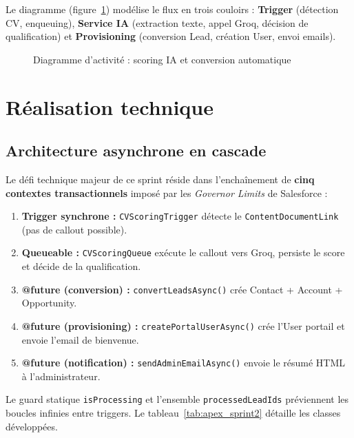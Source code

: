 Le diagramme (figure~\ref{fig:act_scoring}) modélise le flux en trois couloirs : \textbf{Trigger} (détection CV, enqueuing), \textbf{Service IA} (extraction texte, appel Groq, décision de qualification) et \textbf{Provisioning} (conversion Lead, création User, envoi emails).

\begin{figure}[hbt!]
  \centering
  \caption{Diagramme d'activité : scoring IA et conversion automatique}
  \label{fig:act_scoring}
\end{figure}
\FloatBarrier

\section{Réalisation technique}

\subsection{Architecture asynchrone en cascade}

Le défi technique majeur de ce sprint réside dans l'enchaînement de \textbf{cinq contextes transactionnels} imposé par les \textit{Governor Limits} de Salesforce :

\begin{enumerate}
    \item \textbf{Trigger synchrone :} \texttt{CVScoringTrigger} détecte le \texttt{ContentDocumentLink} (pas de callout possible).
    \item \textbf{Queueable :} \texttt{CVScoringQueue} exécute le callout vers Groq, persiste le score et décide de la qualification.
    \item \textbf{@future (conversion) :} \texttt{convertLeadsAsync()} crée Contact + Account + Opportunity.
    \item \textbf{@future (provisioning) :} \texttt{createPortalUserAsync()} crée l'User portail et envoie l'email de bienvenue.
    \item \textbf{@future (notification) :} \texttt{sendAdminEmailAsync()} envoie le résumé HTML à l'administrateur.
\end{enumerate}

Le guard statique \texttt{isProcessing} et l'ensemble \texttt{processedLeadIds} préviennent les boucles infinies entre triggers. Le tableau~\ref{tab:apex_sprint2} détaille les classes développées.

